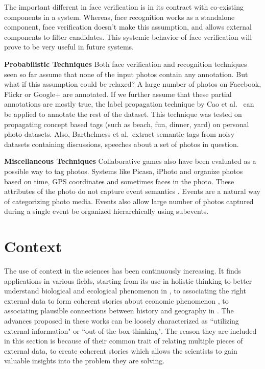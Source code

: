 The important different in face verification is in its contract with co-existing components in a system. Whereas, face recognition works as a standalone component, face verification doesn't make this assumption, and allows external components to filter candidates. This systemic behavior of face verification will prove to be very useful in future systems.

\textbf{Probabilistic Techniques}
Both face verification and recognition techniques seen so far assume that none of the input photos contain any annotation. But what if this assumption could be relaxed? A large number of photos on Facebook, Flickr or Google+ are annotated. If we further assume that these partial annotations are mostly true, the label propagation technique by Cao et al.\ \cite{cao2008annotating} can be applied to annotate the rest of the dataset. This technique was tested on propagating concept based tags (such as beach, fun, dinner, yard) on personal photo datasets. Also, Barthelmess et al.\ extract semantic tags from noisy datasets containing discussions, speeches about a set of photos in question\cite{barthelmess2007toward}. 

\textbf{Miscellaneous Techniques}
Collaborative games also have been evaluated as a possible way to tag photos\cite{diakopoulos2007photoplay}. Systems like Picasa, iPhoto and \cite{graham2002time} organize photos based on time, GPS coordinates and sometimes faces in the photo. These attributes of the photo do not capture event semantics \cite{sawant2011automatic}. Events are a natural way of categorizing photo media. Events also allow large number of photos captured during a single event be organized hierarchically using subevents.

\section{Context}
The use of context in the sciences has been continuously increasing. It finds applications in various fields, starting from its use in holistic thinking to better understand biological and ecological phenomenon in \cite{capra1997web}, to associating the right external data to form coherent stories about economic phenomenon \cite{levitt2006freakonomics}, to associating plausible connections between history and geography in \cite{diamond1997guns}. The advances proposed in these works can be loosely characterized as ``utilizing external information" or ``out-of-the-box thinking". The reason they are included in this section is because of their common trait of relating multiple pieces of external data, to create coherent stories which allows the scientists to gain valuable insights into the problem they are solving.

